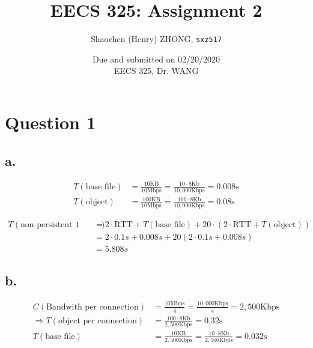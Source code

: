 \documentclass[12pt]{article}
\newcommand{\ilc}{\texttt}
\begin{document}
\title{\textbf{EECS 325: Assignment 2}}

\author{Shaochen (Henry) ZHONG, \ilc{sxz517} }
\date{Due and submitted on 02/20/2020 \\ EECS 325, Dr. WANG}
\maketitle

\section{Question 1}

\subsection{a.}

\begin{align*}
    T(\text{base file}) &= \frac{10 \text{KB}}{10 \text{Mbps}} = \frac{10 \cdot 8 \text{Kb}}{10,000 \text{Kbps}} = 0.008 \text{s} \\
    T(\text{object}) &= \frac{100 \text{KB}}{10 \text{Mbps}} = \frac{100 \cdot 8 \text{Kb}}{10,000 \text{Kbps}} = 0.08 \text{s}
\end{align*}


\begin{align*}
    T(\text{non-persistent 1 TCP}) &= 2 \cdot \text{RTT} + T(\text{base file}) + 20 \cdot (2 \cdot \text{RTT} + T(\text{object})) \\
    &= 2 \cdot 0.1s + 0.008s + 20 (2 \cdot 0.1s + 0.008s) \\
    &= 5.808s
\end{align*}


\subsection{b.}


\begin{align*}
    C(\text{Bandwith per connection}) &= \frac{10 \text{Mbps}}{4} = \frac{10,000 \text{Kbps}}{4} = 2,500 \text{Kbps} \\
    \Longrightarrow T(\text{object per connection}) &= \frac{100 \cdot 8 \text{Kb}}{2,500 \text{Kbps}} = 0.32 \text{s} \\
    T(\text{base file}) &= \frac{10 \text{KB}}{2,500 \text{Kbps}} = \frac{10 \cdot 8 \text{Kb}}{2,500 \text{Kbps}} = 0.032 \text{s} \\
\end{align*}
\end{document}
